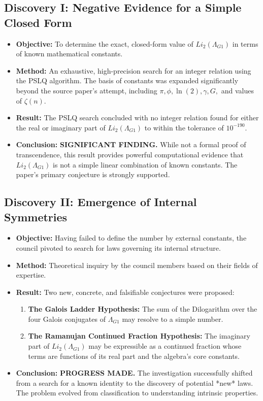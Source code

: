 \documentclass{article}
\begin{document}
\subsection*{Discovery I: Negative Evidence for a Simple Closed Form}
\begin{itemize}
    \item \textbf{Objective:} To determine the exact, closed-form value of $Li_2(\Lambda_{G1})$ in terms of known mathematical constants.
    \item \textbf{Method:} An exhaustive, high-precision search for an integer relation using the PSLQ algorithm. The basis of constants was expanded significantly beyond the source paper's attempt, including $\pi, \phi, \ln(2), \gamma, G,$ and values of $\zeta(n)$.
    \item \textbf{Result:} The PSLQ search concluded with no integer relation found for either the real or imaginary part of $Li_2(\Lambda_{G1})$ to within the tolerance of $10^{-190}$.
    \item \textbf{Conclusion:} \textbf{SIGNIFICANT FINDING.} While not a formal proof of transcendence, this result provides powerful computational evidence that $Li_2(\Lambda_{G1})$ is not a simple linear combination of known constants. The paper's primary conjecture is strongly supported.
\end{itemize}

\subsection*{Discovery II: Emergence of Internal Symmetries}
\begin{itemize}
    \item \textbf{Objective:} Having failed to define the number by external constants, the council pivoted to search for laws governing its internal structure.
    \item \textbf{Method:} Theoretical inquiry by the council members based on their fields of expertise.
    \item \textbf{Result:} Two new, concrete, and falsifiable conjectures were proposed:
        \begin{enumerate}
            \item \textbf{The Galois Ladder Hypothesis:} The sum of the Dilogarithm over the four Galois conjugates of $\Lambda_{G1}$ may resolve to a simple number.
            \item \textbf{The Ramanujan Continued Fraction Hypothesis:} The imaginary part of $Li_2(\Lambda_{G1})$ may be expressible as a continued fraction whose terms are functions of its real part and the algebra's core constants.
        \end{enumerate}
    \item \textbf{Conclusion:} \textbf{PROGRESS MADE.} The investigation successfully shifted from a search for a known identity to the discovery of potential *new* laws. The problem evolved from classification to understanding intrinsic properties.
\end{itemize}
\end{document}
